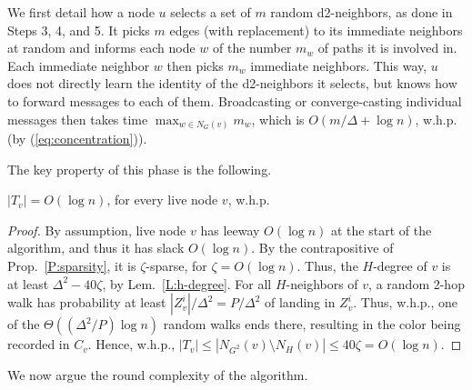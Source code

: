 We first detail how a node $u$ selects a set of $m$ random d2-neighbors, as done in Steps 3, 4, and 5. It picks $m$ edges (with replacement) to its immediate neighbors at random and informs each node $w$ of the number $m_w$ of paths it is involved in. Each immediate neighbor $w$ then picks $m_w$ immediate neighbors. This way, $u$ does not directly learn the identity of the d2-neighbors it selects, but knows how to forward messages to each of them. Broadcasting or converge-casting individual messages then takes time $\max_{w \in N_G(v)} m_w$, which is $O(m/\Delta + \log n)$, w.h.p. (by (\ref{eq:concentration})).

The key property of this phase is the following.

\begin{lemma}
$|T_v| = O(\log n)$, for every live node $v$, w.h.p.
\label{l:last}
\end{lemma}

\begin{proof}
By assumption, live node $v$ has leeway $O(\log n)$ at the start of the algorithm, and thus it has slack $O(\log n)$. 
By the contrapositive of Prop.~\ref{P:sparsity}, it is $\zeta$-sparse, for $\zeta=O(\log n)$. 
Thus, the $H$-degree of $v$ is at least $\Delta^2 - 40\zeta$, by Lem.~\ref{L:h-degree}. For all $H$-neighbors of $v$, a random 2-hop walk has probability at least $|Z_v^i|/\Delta^2 = P/\Delta^2$ of landing in $Z_v^i$. 
Thus, w.h.p., one of the $\Theta((\Delta^2/P)\log n)$ random walks ends there, resulting in the color being recorded in $C_v$. 
Hence, w.h.p., $|T_v| \le |N_{G^2}(v)\setminus N_H(v)| \le 40\zeta = O(\log n)$.
\end{proof}

We now argue the round complexity of the algorithm.

